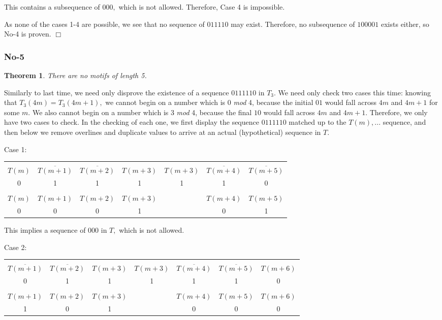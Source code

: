 \documentclass{article}
\newtheorem{theorem}{Theorem}[section]
\begin{document}
This contains a subsequence of $000,$ which is not allowed. Therefore, Case 4 is impossible.

As none of the cases 1-4 are possible, we see that no sequence of $011110$ may exist. Therefore, no subsequence of $100001$ exists either, so No-4 is proven. $\Box$

\subsubsection{No-5}

\begin{theorem}
There are no motifs of length 5.
\end{theorem}

Similarly to last time, we need only disprove the existence of a sequence $0111110$ in $T_3.$ We need only check two cases this time: knowing that $T_3(4m) = T_3(4m + 1),$ we cannot begin on a number which is 0 \emph{mod} 4, because the initial $01$ would fall across $4m$ and $4m+1$ for some $m.$ We also cannot begin on a number which is 3 \emph{mod} 4, because the final $10$ would fall across $4m$ and $4m+1.$ Therefore, we only have two cases to check. In the checking of each one, we first display the sequence $0111110$ matched up to the $T(m), ...$ sequence, and then below we remove overlines and duplicate values to arrive at an actual (hypothetical) sequence in $T.$

Case 1:

\begin{center}
\begin{tabular}{ |c|c|c|c|c|c|c| } 
 \hline
 &&&&&&\\
$T(m)$ & $\overline{T(m+1)}$ & $\overline{T(m+2)}$ & $T(m+3)$ & $T(m+3)$ & $\overline{T(m+4)}$ & $\overline{T(m+5)}$ \\ 
0 & 1 & 1 & 1 & 1 & 1 & 0 \\
\hline
&&&&&&\\
$T(m)$ & $T(m+1)$ & $T(m+2)$ & $T(m+3)$ & & $T(m+4)$ & $T(m+5)$ \\
0 & 0 & 0 & 1 & & 0 & 1 \\
 \hline
\end{tabular}
\end{center}

This implies a sequence of $000$ in $T,$ which is not allowed.

Case 2:

\begin{center}
\begin{tabular}{ |c|c|c|c|c|c|c| } 
 \hline
 &&&&&&\\
$\overline{T(m+1)}$ & $\overline{T(m+2)}$ & $T(m+3)$ & $T(m+3)$ & $\overline{T(m+4)}$ & $\overline{T(m+5)}$ & $T(m+6)$\\ 
0 & 1 & 1 & 1 & 1 & 1 & 0 \\
\hline
&&&&&&\\
$T(m+1)$ & $T(m+2)$ & $T(m+3)$ & & $T(m+4)$ & $T(m+5)$ & $T(m+6)$ \\
 1 & 0 & 1 & & 0 & 0 & 0 \\
 \hline
\end{tabular}
\end{center}
\end{document}
